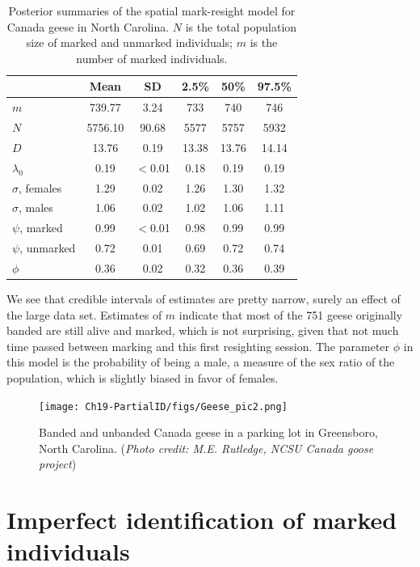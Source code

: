 \begin{table}
\label{partialID.tab.geese}
\centering
  \caption{Posterior summaries of the spatial mark-resight model for Canada geese in North Carolina. $N$ is the total population size of marked and unmarked individuals; $m$ is the number of marked individuals.}
  \begin{tabular}{lccccc}
             \hline
       &   Mean &   SD &  2.5\% & 50\% & 97.5\% \\
           \hline
$m$      &  739.77 & 3.24  &  733 & 740  & 746 \\
$N$      & 5756.10 & 90.68 & 5577 & 5757 & 5932 \\
$D$       &  13.76 & 0.19 & 13.38 & 13.76 & 14.14 \\
$\lambda_0$ &  0.19 & $<$0.01 & 0.18 & 0.19 & 0.19 \\
$\sigma$, females  &  1.29 & 0.02 & 1.26 & 1.30 & 1.32 \\
$\sigma$, males  &  1.06 & 0.02 & 1.02 & 1.06 & 1.11 \\
$\psi$, marked    & 0.99 & $<$0.01 & 0.98  & 0.99  & 0.99 \\
$\psi$, unmarked   & 0.72  & 0.01 & 0.69 & 0.72  & 0.74 \\
$\phi$     &  0.36 & 0.02 & 0.32 & 0.36 & 0.39 \\
    \hline
  \end{tabular}
\end{table}

We see that credible intervals of estimates are pretty narrow, surely an effect of the large data set. Estimates of $m$ indicate that most of the 751 geese originally banded are still alive and marked, which is not surprising, given that not much time passed between marking and this first resighting session. The parameter $\phi$ in this model is the probability of being a male, a measure of the sex ratio of the population, which is slightly biased in favor of females.

\begin{figure}[ht]
  \centering
  \texttt{[image: Ch19-PartialID/figs/Geese\_pic2.png]}
  \caption{Banded and unbanded Canada geese in a parking lot in Greensboro, North Carolina.
({\it Photo credit: M.E. Rutledge, NCSU Canada goose project})}
  \label{partialID.fig.geese}
\end{figure}


\section  {Imperfect identification of marked individuals}
\label{partialID.sec.IDrate}

